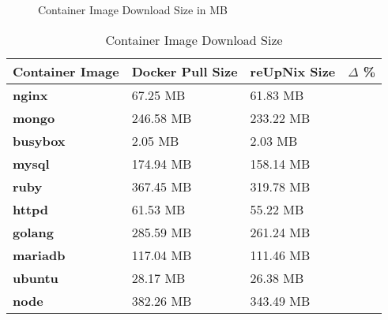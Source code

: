 \begin{figure}[htbp]
  \centering
  \caption{Container Image Download Size in MB}
  \label{fig:container-size}
\end{figure}

\clearpage

\begin{table}[H]
	\centering
	\begin{tabular}{l|l|l|l}
	\toprule
		Container Image & Docker Pull Size & reUpNix Size & $\Delta$ \% \\
	\midrule
    \textbf{nginx} & 67.25 MB & 61.83 MB & \color{ba-green}{- 8.0\%} \\
    \textbf{mongo} & 246.58 MB & 233.22 MB & \color{ba-green}{- 5.6\%} \\
    \textbf{busybox} & 2.05 MB & 2.03 MB & \color{ba-green}{- 0.9\%} \\
    \textbf{mysql} & 174.94 MB & 158.14 MB & \color{ba-green}{- 9.6\%} \\
    \textbf{ruby} & 367.45 MB & 319.78 MB & \color{ba-green}{- 12.9\%} \\
    \textbf{httpd} & 61.53 MB & 55.22 MB & \color{ba-green}{- 10.2\%} \\
    \textbf{golang} & 285.59 MB & 261.24 MB & \color{ba-green}{- 8.5\%} \\
    \textbf{mariadb} & 117.04 MB & 111.46 MB & \color{ba-green}{- 4.7\%} \\
    \textbf{ubuntu} & 28.17 MB & 26.38 MB & \color{ba-green}{- 6.3\%} \\
    \textbf{node} & 382.26 MB & 343.49 MB & \color{ba-green}{- 10.1\%} \\
	\bottomrule
	\end{tabular}
	\caption{Container Image Download Size}
	\label{tab:container-size}
\end{table}

